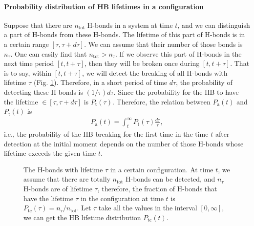 {\paragraph{Probability distribution of HB lifetimes in a configuration}\label{P_tc}
Suppose that there are $n_\text{tot}$ H-bonds in a system at time $t$, and we can distinguish a part of H-bonds from these H-bonds. 
The lifetime of this part of H-bonds is in a certain range $[\tau, \tau + d\tau]$. We can assume that their number of those bonds is $n_\tau$. 
One can easily find that $n_\text{tot}>n_\tau$. If we observe this part of H-bonds in the next time period $[t, t+\tau]$, 
then they will be broken once during $[t, t+\tau]$. 
That is to say, within $[t,t+\tau]$, we will detect the breaking of all H-bonds with lifetime $\tau$ (Fig. \ref{fig:P_tc}).  
Therefore, in a short period of time $d\tau$, the probability of detecting these H-bonds is $(1/\tau)d\tau$.
Since the probability for the HB to have the lifetime $\in [\tau,\tau+d\tau]$ is $P_\text{t}(\tau)$. 
Therefore, the relation between $P_\text{a}(t)$ and $P_\text{t}(t)$ is
\begin{eqnarray}
P_\text{a}(t) = \int_t^\infty P_\text{t}(\tau)\frac{d\tau}{\tau},
\label{eq:Pt_and_P}
\end{eqnarray}
i.e., the probability of the HB breaking for the first time in the time $t$ after detection at the initial moment depends on 
the number of those H-bonds whose lifetime exceeds the given time $t$\cite{Voloshin2009}.
\begin{figure}
\centering
{}
  \caption{\label{fig:P_tc} The H-bonds with lifetime $\tau$ in a certain configuration. 
At time $t$, we assume that there are totally $n_\text{tot}$ H-bonds can be detected, and $n_{\tau}$ H-bonds are of lifetime $\tau$, therefore,  the fraction of H-bonds that 
have the lifetime $\tau$ in the configuration at time $t$ is $P_\text{tc}(\tau) =  n_{\tau} /n_\text{tot}$.
Let $\tau$ take all the values in the interval $[0,\infty]$, we can get the HB lifetime distribution $P_\text{tc}(t)$.
}
\end{figure}

}
